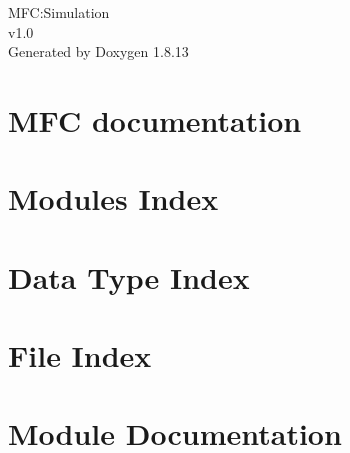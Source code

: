 \documentclass[twoside]{book}
\newcommand{\+}{\discretionary{\mbox{\scriptsize$\hookleftarrow$}}{}{}}
\newcommand{\clearemptydoublepage}{%
  \newpage{\pagestyle{empty}\cleardoublepage}%
}
\begin{document}
\hypersetup{pageanchor=false,
             bookmarksnumbered=true,
             pdfencoding=unicode
            }
\begin{titlepage}
\vspace*{7cm}
\begin{center}%
{\Large M\+FC\+:Simulation \\[1ex]\large v1.\+0 }\\
\vspace*{1cm}
{\large Generated by Doxygen 1.8.13}\\
\end{center}
\end{titlepage}
\clearemptydoublepage
{}
\tableofcontents
\clearemptydoublepage
{}
\hypersetup{pageanchor=true}

\chapter{M\+FC documentation}
\label{index}\hypertarget{index}{}
\chapter{Modules Index}

\chapter{Data Type Index}

\chapter{File Index}

\chapter{Module Documentation}















\end{document}
